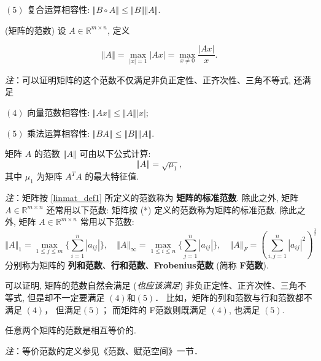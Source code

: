 $(5)$ 复合运算相容性: $\left\Vert B\circ A\right\Vert \leqslant\left\Vert B\right\Vert \left\Vert A\right\Vert $.



\begin{definition}{(矩阵的范数)}\label{linmat_def1}
设 $A\in\mathbb{R}^{m\times n}$, 定义

\[
\left\Vert A\right\Vert =\max_{|x|=1}|Ax|=\max_{x\neq0}{\displaystyle \frac{|Ax|}{x}}.
\]

\end{definition}
\textsl{注}：可以证明矩阵的这个范数不仅满足非负正定性、正齐次性、三角不等式, 还满足

$(4)$ 向量范数相容性: $\left\Vert Ax\right\Vert \leqslant\left\Vert A\right\Vert \left|x\right|$;

$(5)$ 乘法运算相容性: $\left\Vert BA\right\Vert \leqslant\left\Vert B\right\Vert \left\Vert A\right\Vert $.



\begin{theorem}{}
矩阵 $A$ 的范数 $\left\Vert A\right\Vert $ 可由以下公式计算: 
\[
\left\Vert A\right\Vert =\sqrt{\mu_{1}},
\]
 其中 $\mu_{1}$ 为矩阵 $A^{T}A$ 的最大特征值. 
\end{theorem}

\textsl{注}：矩阵按 \autoref{linmat_def1} 所定义的范数称为 \textbf{矩阵的标准范数}. 除此之外, 矩阵 $A\in\mathbb{R}^{m\times n}$ 还常用以下范数:
矩阵按 ({*}) 定义的范数称为矩阵的标准范数. 除此之外, 矩阵 $A\in\mathbb{R}^{m\times n}$ 常用以下范数:
\[
\left\Vert A\right\Vert _{1}=\max_{1\leqslant j\leqslant m}\{\sum_{i=1}^{n}|a_{ij}|\},\quad\left\Vert A\right\Vert _{\infty}=\max_{1\leqslant i\leqslant n}\{\sum_{j=1}^{n}|a_{ij}|\},\quad\left\Vert A\right\Vert _{F}=\left(\sum_{i,j=1}^{n}|a_{ij}|^{2}\right)^{\frac{1}{2}}
\]
分别称为矩阵的 \textbf{列和范数}、\textbf{行和范数}、\textbf{Frobenius范数} (简称 \textbf{F范数}). 

 可以证明, 矩阵的范数自然会满足 (\textsl{也应该满足}) 非负正定性、正齐次性、三角不等式, 但是却不一定要满足 $(4)$和$(5)$． 比如，矩阵的列和范数与行和范数都不满足 $(4)$， 但满足$(5)$； 而矩阵的 F范数则既满足 $(4)$, 也满足 $(5)$. 



\begin{theorem}{}
任意两个矩阵的范数是相互等价的. 

\textsl{注}：等价范数的定义参见《范数、赋范空间》一节．
\end{theorem}
\verb| |

